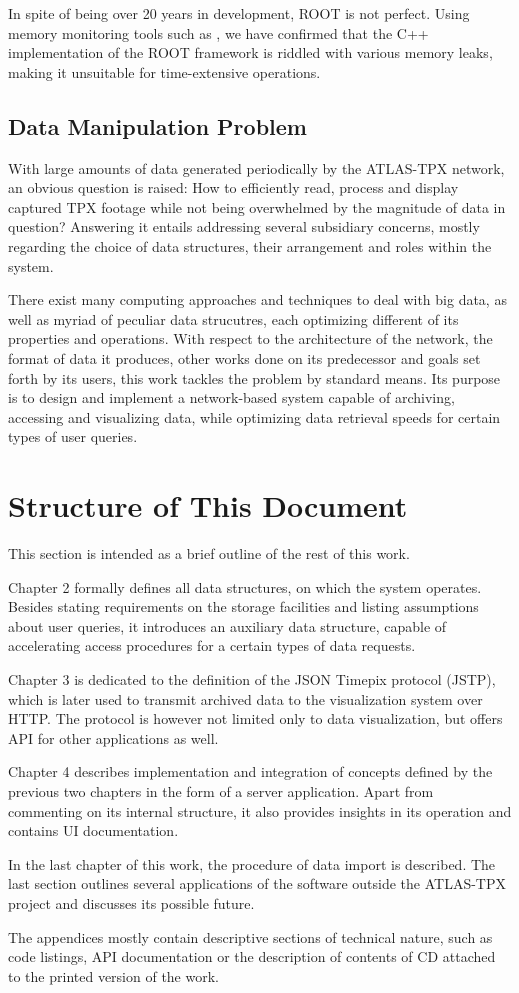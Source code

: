 In spite of being over 20 years in development, ROOT is not perfect. Using memory monitoring tools such as \cite{nethercote2007valgrind}, we have confirmed that the C++ implementation of the ROOT framework is riddled with various memory leaks, making it unsuitable for time-extensive operations.

\subsection{Data Manipulation Problem}
With large amounts of data generated periodically by the ATLAS-TPX network, an obvious question is raised: How to efficiently read, process and display captured TPX footage while not being overwhelmed by the magnitude of data in question? Answering it entails addressing several subsidiary concerns, mostly regarding the choice of data structures, their arrangement and roles within the system.

There exist many computing approaches and techniques to deal with big data, as well as myriad of peculiar data strucutres, each optimizing different of its properties and operations. With respect to the architecture of the network, the format of data it produces, other works done on its predecessor and goals set forth by its users, this work tackles the problem by standard means. Its purpose is to design and implement a network-based system capable of archiving, accessing and visualizing data, while optimizing data retrieval speeds for certain types of user queries.

\section{Structure of This Document}
This section is intended as a brief outline of the rest of this work.

Chapter 2 formally defines all data structures, on which the system operates. Besides stating requirements on the storage facilities and listing assumptions about user queries, it introduces an auxiliary data structure, capable of accelerating access procedures for a certain types of data requests.

Chapter 3 is dedicated to the definition of the JSON Timepix protocol (JSTP), which is later used to transmit archived data to the visualization system over HTTP. The protocol is however not limited only to data visualization, but offers API for other applications as well.

Chapter 4 describes implementation and integration of concepts defined by the previous two chapters in the form of a server application. Apart from commenting on its internal structure, it also provides insights in its operation and contains UI documentation.

In the last chapter of this work, the procedure of data import is described. The last section outlines several applications of the software outside the ATLAS-TPX project and discusses its possible future.

The appendices mostly contain descriptive sections of technical nature, such as code listings, API documentation or the description of contents of CD attached to the printed version of the work.
